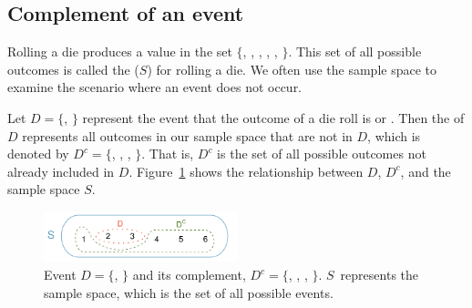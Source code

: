 \subsection{Complement of an event}

Rolling a die produces a value in the set $\{$, , , , , $\}$. This set of all possible outcomes is called the  ($S$) for rolling a die. We often use the sample space to examine the scenario where an event does not occur.

Let $D=\{$, $\}$ represent the event that the outcome of a die roll is  or . Then the  of $D$ represents all outcomes in our sample space that are not in $D$, which is denoted by $D^c = \{$, , , $\}$. That is, $D^c$ is the set of all possible outcomes not already included in $D$. Figure~\ref{complementOfD} shows the relationship between $D$, $D^c$, and the sample space $S$.

\begin{figure}[hht]
\centering
\includegraphics[width=0.5\textwidth]{ch_probability/figures/complementOfD/complementOfD}
\caption{Event $D=\{$, $\}$ and its complement, $D^c = \{$, , , $\}$. $S$~represents the sample space, which is the set of all possible events.}
\label{complementOfD}

\end{figure}

